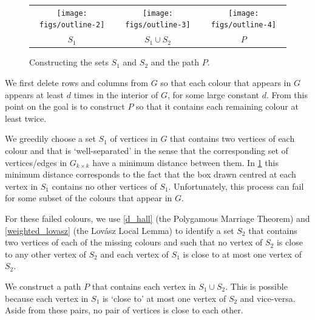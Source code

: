 \documentclass{patmorin}
\begin{document}
\begin{figure}
  \begin{center}
    \begin{tabular}{ccc}
      \texttt{[image: figs/outline-2]} &
      \texttt{[image: figs/outline-3]} &
      \texttt{[image: figs/outline-4]} \\
      $S_1$ & $S_1\cup S_2$ & $P$
    \end{tabular}
  \end{center}
  \caption{Constructing the sets $S_1$ and $S_2$ and the path $P$.}
  \label{outline}
\end{figure}
\begin{compactenum}

  \item We first delete rows and columns from $G$ so that each colour that appears in $G$ appears at least $d$ times in the interior of $G$, for some large constant $d$.  From this point on the goal is to construct $P$ so that it contains each remaining colour at least twice.

  \item We greedily choose a set $S_1$ of vertices in $G$ that contains two vertices of each colour and that is `well-separated' in the sense that the corresponding set of vertices/edges in $G_{k\times k}$ have a minimum distance between them.  In \cref{outline} this minimum distance corresponds to the fact that the box drawn centred at each vertex in $S_1$ contains no other vertices of $S_1$.
  Unfortunately, this process can fail for some subset of the colours that appear in $G$.

  \item For these failed colours, we use \cref{d_hall} (the Polygamous Marriage Theorem) and \cref{weighted_lovasz} (the Lovász Local Lemma) to identify a set $S_2$ that contains two vertices of each of the missing colours and such that no vertex of $S_2$ is close to any other vertex of $S_2$ and each vertex of $S_1$ is close to at most one vertex of $S_2$.

  \item We construct a path $P$ that contains each vertex in $S_1\cup S_2$.  This is possible because each vertex in $S_1$ is `close to' at most one vertex of $S_2$ and vice-versa.  Aside from these pairs, no pair of vertices is close to each other.
\end{compactenum}
\end{document}
